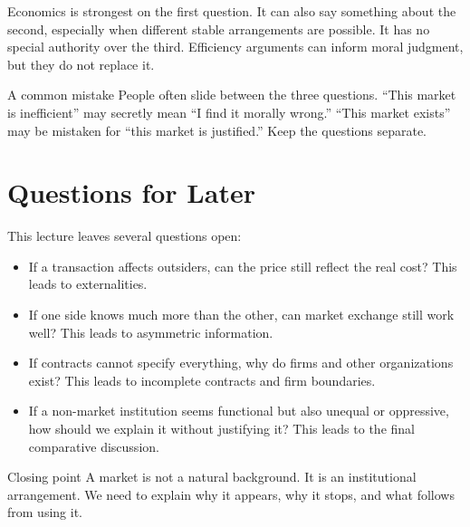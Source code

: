 \documentclass[10pt,a4paper]{article}
\begin{document}
Economics is strongest on the first question. It can also say something about the second, especially when different stable arrangements are possible. It has no special authority over the third. Efficiency arguments can inform moral judgment, but they do not replace it.

\begin{insightbox}{A common mistake}
People often slide between the three questions. ``This market is inefficient'' may secretly mean ``I find it morally wrong.'' ``This market exists'' may be mistaken for ``this market is justified.'' Keep the questions separate.
\end{insightbox}

\section{Questions for Later}

This lecture leaves several questions open:

\begin{itemize}
  \item If a transaction affects outsiders, can the price still reflect the real cost? This leads to externalities.
  \item If one side knows much more than the other, can market exchange still work well? This leads to asymmetric information.
  \item If contracts cannot specify everything, why do firms and other organizations exist? This leads to incomplete contracts and firm boundaries.
  \item If a non-market institution seems functional but also unequal or oppressive, how should we explain it without justifying it? This leads to the final comparative discussion.
\end{itemize}

\begin{insightbox}{Closing point}
A market is not a natural background. It is an institutional arrangement. We need to explain why it appears, why it stops, and what follows from using it.
\end{insightbox}
\end{document}
